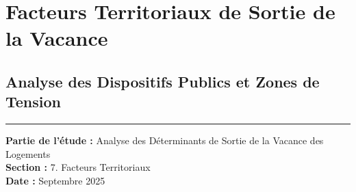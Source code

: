 \documentclass[11pt]{article}
\makeatletter
\newcommand{\boxspacing}{\kern\kvtcb@left@rule\kern\kvtcb@boxsep}
\newcommand{\prompt}[4]{
        {\ttfamily\llap{{\color{#2}[#3]:\hspace{3pt}#4}}\vspace{-\baselineskip}}
    }
\makeatother
\begin{document}
    \begin{tcolorbox}[breakable, size=fbox, boxrule=1pt, pad at break*=1mm,colback=cellbackground, colframe=cellborder]
\prompt{In}{incolor}{ }{\boxspacing}
\begin{Verbatim}[commandchars=\\\{\}]

\end{Verbatim}
\end{tcolorbox}

    \begin{tcolorbox}[breakable, size=fbox, boxrule=1pt, pad at break*=1mm,colback=cellbackground, colframe=cellborder]
\prompt{In}{incolor}{ }{\boxspacing}
\begin{Verbatim}[commandchars=\\\{\}]

\end{Verbatim}
\end{tcolorbox}

    \begin{tcolorbox}[breakable, size=fbox, boxrule=1pt, pad at break*=1mm,colback=cellbackground, colframe=cellborder]
\prompt{In}{incolor}{ }{\boxspacing}
\begin{Verbatim}[commandchars=\\\{\}]

\end{Verbatim}
\end{tcolorbox}

    \section{Facteurs Territoriaux de Sortie de la
Vacance}\label{facteurs-territoriaux-de-sortie-de-la-vacance}

\subsection{Analyse des Dispositifs Publics et Zones de
Tension}\label{analyse-des-dispositifs-publics-et-zones-de-tension}

\begin{center}\rule{0.5\linewidth}{0.5pt}\end{center}

\textbf{Partie de l'étude :} Analyse des Déterminants de Sortie de la
Vacance des Logements\\
\textbf{Section :} 7. Facteurs Territoriaux\\
\textbf{Date :} Septembre 2025
\end{document}
